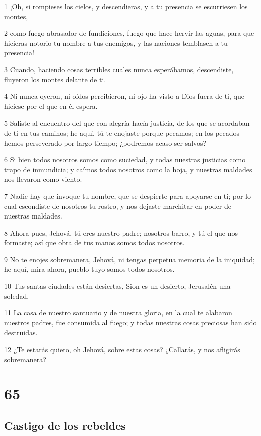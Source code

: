 \par 1 ¡Oh, si rompieses los cielos, y descendieras, y a tu presencia se escurriesen los montes,
\par 2 como fuego abrasador de fundiciones, fuego que hace hervir las aguas, para que hicieras notorio tu nombre a tus enemigos, y las naciones temblasen a tu presencia!
\par 3 Cuando, haciendo cosas terribles cuales nunca esperábamos, descendiste, fluyeron los montes delante de ti.
\par 4 Ni nunca oyeron, ni oídos percibieron, ni ojo ha visto a Dios fuera de ti, que hiciese por el que en él espera. 
\par 5 Saliste al encuentro del que con alegría hacía justicia, de los que se acordaban de ti en tus caminos; he aquí, tú te enojaste porque pecamos; en los pecados hemos perseverado por largo tiempo; ¿podremos acaso ser salvos?
\par 6 Si bien todos nosotros somos como suciedad, y todas nuestras justicias como trapo de inmundicia; y caímos todos nosotros como la hoja, y nuestras maldades nos llevaron como viento.
\par 7 Nadie hay que invoque tu nombre, que se despierte para apoyarse en ti; por lo cual escondiste de nosotros tu rostro, y nos dejaste marchitar en poder de nuestras maldades.
\par 8 Ahora pues, Jehová, tú eres nuestro padre; nosotros barro, y tú el que nos formaste; así que obra de tus manos somos todos nosotros.
\par 9 No te enojes sobremanera, Jehová, ni tengas perpetua memoria de la iniquidad; he aquí, mira ahora, pueblo tuyo somos todos nosotros.
\par 10 Tus santas ciudades están desiertas, Sion es un desierto, Jerusalén una soledad.
\par 11 La casa de nuestro santuario y de nuestra gloria, en la cual te alabaron nuestros padres, fue consumida al fuego; y todas nuestras cosas preciosas han sido destruidas.
\par 12 ¿Te estarás quieto, oh Jehová, sobre estas cosas? ¿Callarás, y nos afligirás sobremanera?

\chapter{65}

\section*{Castigo de los rebeldes}

